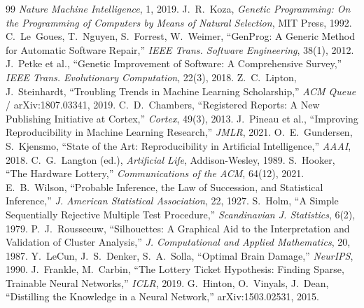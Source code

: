 \documentclass[11pt]{article}
\begin{document}
\begin{thebibliography}{99}
\emph{Nature Machine Intelligence}, 1, 2019.
 J.~R.~Koza,
\emph{Genetic Programming: On the Programming of Computers by Means of Natural
Selection}, MIT Press, 1992.
 C.~Le~Goues, T.~Nguyen, S.~Forrest, W.~Weimer,
``GenProg: A Generic Method for Automatic Software Repair,''
\emph{IEEE Trans. Software Engineering}, 38(1), 2012.
 J.~Petke et al.,
``Genetic Improvement of Software: A Comprehensive Survey,''
\emph{IEEE Trans. Evolutionary Computation}, 22(3), 2018.
 Z.~C.~Lipton, J.~Steinhardt,
``Troubling Trends in Machine Learning Scholarship,''
\emph{ACM Queue} / arXiv:1807.03341, 2019.
 C.~D.~Chambers,
``Registered Reports: A New Publishing Initiative at Cortex,''
\emph{Cortex}, 49(3), 2013.
 J.~Pineau et al.,
``Improving Reproducibility in Machine Learning Research,'' \emph{JMLR}, 2021.
 O.~E.~Gundersen, S.~Kjensmo,
``State of the Art: Reproducibility in Artificial Intelligence,''
\emph{AAAI}, 2018.
 C.~G.~Langton (ed.),
\emph{Artificial Life}, Addison-Wesley, 1989.
 S.~Hooker,
``The Hardware Lottery,'' \emph{Communications of the ACM}, 64(12), 2021.
 E.~B.~Wilson,
``Probable Inference, the Law of Succession, and Statistical Inference,''
\emph{J. American Statistical Association}, 22, 1927.
 S.~Holm,
``A Simple Sequentially Rejective Multiple Test Procedure,''
\emph{Scandinavian J. Statistics}, 6(2), 1979.
 P.~J.~Rousseeuw,
``Silhouettes: A Graphical Aid to the Interpretation and Validation of Cluster
Analysis,'' \emph{J. Computational and Applied Mathematics}, 20, 1987.
 Y.~LeCun, J.~S.~Denker, S.~A.~Solla,
``Optimal Brain Damage,'' \emph{NeurIPS}, 1990.
 J.~Frankle, M.~Carbin,
``The Lottery Ticket Hypothesis: Finding Sparse, Trainable Neural Networks,''
\emph{ICLR}, 2019.
 G.~Hinton, O.~Vinyals, J.~Dean,
``Distilling the Knowledge in a Neural Network,'' arXiv:1503.02531, 2015.
\end{thebibliography}

\appendix
\end{document}
